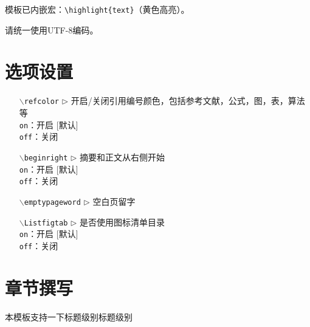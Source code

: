 模板已内嵌宏：\verb|\highlight{text}|（黄色高亮）。
 
请统一使用UTF-8编码。



\section{选项设置}

\begin{itemize}[leftmargin=3cm]
  \item[{\tt  $\backslash$refcolor} $\triangleright$]  开启/关闭引用编号颜色，包括参考文献，公式，图，表，算法等\\
  \texttt{on}：开启 [默认]\\
  \texttt{off}：关闭
  \item[{\tt $\backslash$beginright} $\triangleright$]  摘要和正文从右侧开始\\
  \texttt{on}：开启 [默认]\\
  \texttt{off}：关闭
  \item[{\tt $\backslash$emptypageword} $\triangleright$]  空白页留字
  \item[{\tt $\backslash$Listfigtab} $\triangleright$]  是否使用图标清单目录\\
  \texttt{on}：开启 [默认]\\
  \texttt{off}：关闭
\end{itemize}


\section{章节撰写}
本模板支持一下标题级别标题级别

